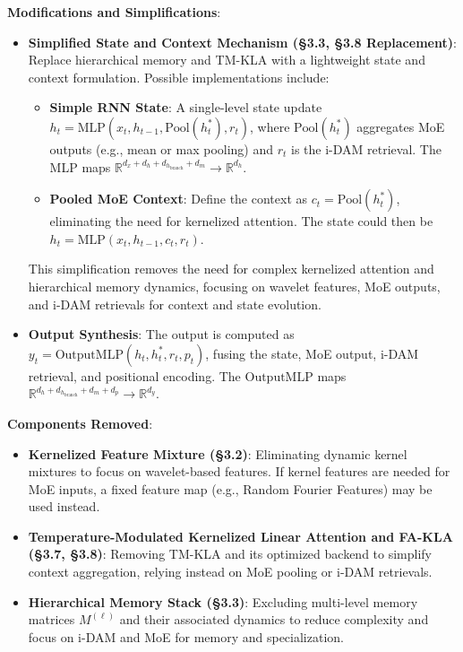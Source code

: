 \documentclass{article}
\begin{document}
\textbf{Modifications and Simplifications}:
\begin{itemize}
    \item \textbf{Simplified State and Context Mechanism (\S3.3, \S3.8 Replacement)}: Replace hierarchical memory and TM-KLA with a lightweight state and context formulation. Possible implementations include:
    \begin{itemize}
        \item \textbf{Simple RNN State}: A single-level state update $h_t = \text{MLP}(x_t, h_{t-1}, \text{Pool}(h^*_t), r_t)$, where $\text{Pool}(h^*_t)$ aggregates MoE outputs (e.g., mean or max pooling) and $r_t$ is the i-DAM retrieval. The MLP maps $\mathbb{R}^{d_x + d_h + d_{h_{\text{branch}}} + d_m} \to \mathbb{R}^{d_h}$.
        \item \textbf{Pooled MoE Context}: Define the context as $c_t = \text{Pool}(h^*_t)$, eliminating the need for kernelized attention. The state could then be $h_t = \text{MLP}(x_t, h_{t-1}, c_t, r_t)$.
    \end{itemize}
    This simplification removes the need for complex kernelized attention and hierarchical memory dynamics, focusing on wavelet features, MoE outputs, and i-DAM retrievals for context and state evolution.
    \item \textbf{Output Synthesis}: The output is computed as $y_t = \text{OutputMLP}(h_t, h^*_t, r_t, p_t)$, fusing the state, MoE output, i-DAM retrieval, and positional encoding. The $\text{OutputMLP}$ maps $\mathbb{R}^{d_h + d_{h_{\text{branch}}} + d_m + d_p} \to \mathbb{R}^{d_y}$.
\end{itemize}

\textbf{Components Removed}:
\begin{itemize}
    \item \textbf{Kernelized Feature Mixture (\S3.2)}: Eliminating dynamic kernel mixtures to focus on wavelet-based features. If kernel features are needed for MoE inputs, a fixed feature map (e.g., Random Fourier Features) may be used instead.
    \item \textbf{Temperature-Modulated Kernelized Linear Attention and FA-KLA (\S3.7, \S3.8)}: Removing TM-KLA and its optimized backend to simplify context aggregation, relying instead on MoE pooling or i-DAM retrievals.
    \item \textbf{Hierarchical Memory Stack (\S3.3)}: Excluding multi-level memory matrices $M^{(\ell)}$ and their associated dynamics to reduce complexity and focus on i-DAM and MoE for memory and specialization.
\end{itemize}
\end{document}
